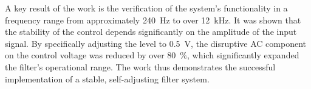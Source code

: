 \documentclass[a4paper,11pt]{book}
\begin{document}
A key result of the work is the verification of the system's functionality in a frequency range from approximately \SI{240}{\hertz} to over \SI{12}{\kilo\hertz}. It was shown that the stability of the control depends significantly on the amplitude of the input signal. By specifically adjusting the level to \SI{0.5}{\volt}, the disruptive AC component on the control voltage was reduced by over \SI{80}{\percent}, which significantly expanded the filter's operational range. The work thus demonstrates the successful implementation of a stable, self-adjusting filter system.\par
\medskip





\clearpage{\pagestyle{empty}\cleardoublepage}
\tableofcontents


\clearpage{\pagestyle{empty}\cleardoublepage}
\listoffigures
{}



\clearpage{\pagestyle{empty}\cleardoublepage}
\listoftables
{}



\clearpage{\pagestyle{empty}\cleardoublepage}
\printglossary[type=\acronymtype, title=Abkürzungsverzeichnis, nonumberlist]



\mainmatter
\pagestyle{fancy}
{}  
\setcounter{page}{1}


















\backmatter
\appendix
\printbibliography



\newpage
\end{document}

